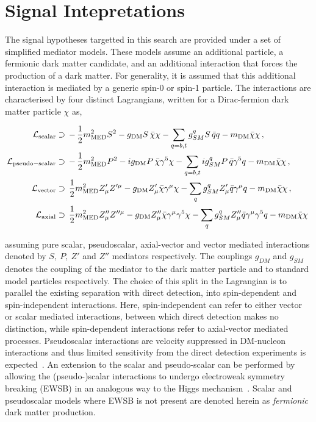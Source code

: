 \section{Signal Intepretations}
The signal hypotheses targetted in this search are provided under a set of simplified mediator models. These models assume an additional particle, 
a fermionic dark matter candidate, and an additional interaction that forces the production of a dark matter. 
For generality, it is assumed that this additional interaction is mediated by a generic spin-0 or spin-1 particle. 
The interactions are characterised by four distinct Lagrangians, written for a Dirac-fermion dark matter particle $\chi$ as, 

\begin{align}
\label{eq:LS} 
\mathcal{L}_{\mathrm{scalar}}&\supset\, -\,\frac{1}{2}m_{\rm MED}^2 S^2 - g_{\rm DM}  S \, \bar{\chi}\chi
 - \sum_{q=b,t} g_{SM}^q S \, \bar{q}q  - m_{\rm DM} \bar{\chi}\chi \,,
 \\
 \label{eq:LP} 
\mathcal{L}_{\rm{pseudo-scalar}}&\supset\, -\,\frac{1}{2}m_{\rm MED}^2 P^2 - i g_{\rm DM}  P \, \bar{\chi} \gamma^5\chi
 -\sum_{q=b,t}  i g_{SM}^q  P \, \bar{q}  \gamma^5q  - m_{\rm DM} \bar{\chi}\chi\,,
 \\
 \label{eq:LV} 
\mathcal{L}_{\mathrm{vector}}&\supset \, \frac{1}{2}m_{\rm MED}^2 Z'_{\mu} Z'^{\mu} - g_{\rm DM}Z'_{\mu} \bar{\chi}\gamma^{\mu}\chi -\sum_q g_{SM}^q Z'_{\mu} \bar{q}\gamma^{\mu}q - m_{\rm DM} \bar{\chi}\chi\,,
 \\
 \label{eq:LA} 
\mathcal{L}_{\rm{axial}}&\supset\,  \frac{1}{2}m_{\rm MED}^2 Z''_{\mu} Z''^{\mu} - g_{\rm DM} Z''_{\mu} \bar{\chi}\gamma^{\mu}\gamma^5\chi -\sum_q g_{SM}^q Z''_{\mu} \bar{q}\gamma^{\mu}\gamma^5q - m_{\rm DM} \bar{\chi}\chi\,
\end{align}

assuming pure scalar, pseudoscalar, axial-vector and vector mediated interactions denoted by $S,~P,~Z'$ and $Z''$ mediators respectively. 
The couplings $g_{DM}$ and $g_{SM}$ denotes the coupling of the mediator to the dark matter particle and to standard model particles respectively. 
The choice of this split in the Lagrangian is to parallel the existing separation with direct detection, into spin-dependent and spin-independent interactions. 
Here, spin-independent can refer to either vector or scalar mediated interactions, between which direct detection makes no distinction, while 
spin-dependent interactions refer to axial-vector mediated processes. 
Pseudoscalar interactions are velocity suppressed in DM-nucleon interactions and thus limited sensitivity from the direct detection experiments is expected~\cite{Haisch:2012kf}. 
An extension to the scalar and pseudo-scalar can be performed by allowing the (pseudo-)scalar interactions to undergo electroweak symmetry breaking (EWSB) in an analogous way to 
the Higgs mechanism~\cite{Khoze:2015sra,Hambye:2013sna,Khoze:2014xha,Khoze:2014woa,Altmannshofer:2014vra,Carone:2013wla,Heikinheimo:2013fta}. Scalar and pseudoscalar models 
where EWSB is not present are denoted herein as \emph{fermionic} dark matter production.

